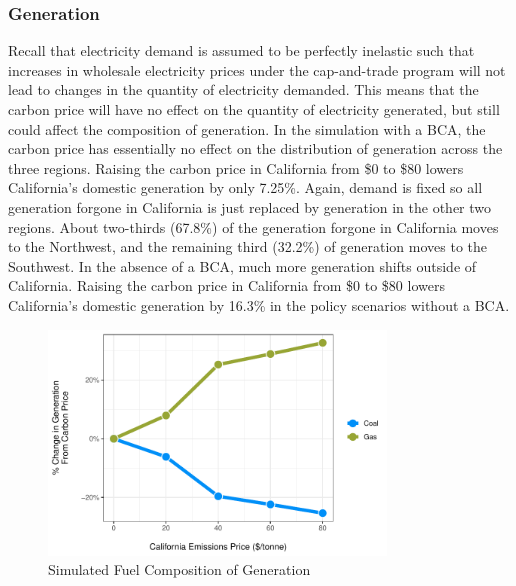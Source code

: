 \subsubsection*{Generation}

Recall that electricity demand is assumed to be perfectly inelastic such that increases in wholesale electricity prices under the cap-and-trade program will not lead to changes in the quantity of electricity demanded. This means that the carbon price will have no effect on the quantity of electricity generated, but still could affect the composition of generation. In the simulation with a BCA, the carbon price has essentially no effect on the distribution of generation across the three regions. Raising the carbon price in California from \$0 to \$80 lowers California's domestic generation by only 7.25\%. Again, demand is fixed so all generation forgone in California is just replaced by generation in the other two regions. About two-thirds (67.8\%) of the generation forgone in California moves to the Northwest, and the remaining third (32.2\%) of generation moves to the Southwest. In the absence of a BCA, much more generation shifts outside of California. Raising the carbon price in California from \$0 to \$80 lowers California's domestic generation by 16.3\% in the policy scenarios without a BCA.

\begin{figure}
    \centering
    \caption{Simulated Fuel Composition of Generation \label{gen_fuel_bca_pct}}
    \includegraphics[width=0.8\textwidth]{figures/chapter5_figures/gen_fuel_bca_pct.pdf}
\end{figure}

